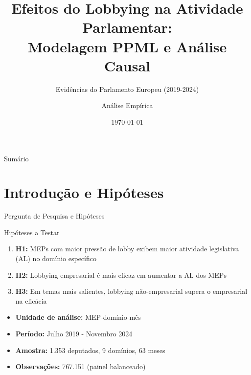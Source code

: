 \documentclass[aspectratio=169]{beamer}
\title{Efeitos do Lobbying na Atividade Parlamentar: \\ Modelagem PPML e Análise Causal}
\subtitle{Evidências do Parlamento Europeu (2019-2024)}
\author{Análise Empírica}
\institute{Estudo de Lobbying e Política Europeia}
\date{\today}
\begin{document}
\begin{frame}
\titlepage
\end{frame}

\begin{frame}{Sumário}
\tableofcontents
\end{frame}


\section{Introdução e Hipóteses}

\begin{frame}{Pergunta de Pesquisa e Hipóteses}
\begin{block}{Hipóteses a Testar}
\begin{enumerate}
\item \textbf{H1:} MEPs com maior pressão de lobby exibem maior atividade legislativa (AL) no domínio específico
\item \textbf{H2:} Lobbying empresarial é mais eficaz em aumentar a AL dos MEPs
\item \textbf{H3:} Em temas mais salientes, lobbying não-empresarial supera o empresarial na eficácia
\end{enumerate}
\end{block}

\vspace{0.5cm}

\begin{itemize}
\item \textbf{Unidade de análise:} MEP-domínio-mês
\item \textbf{Período:} Julho 2019 - Novembro 2024
\item \textbf{Amostra:} 1.353 deputados, 9 domínios, 63 meses
\item \textbf{Observações:} 767.151 (painel balanceado)
\end{itemize}
\end{frame}
\end{document}
